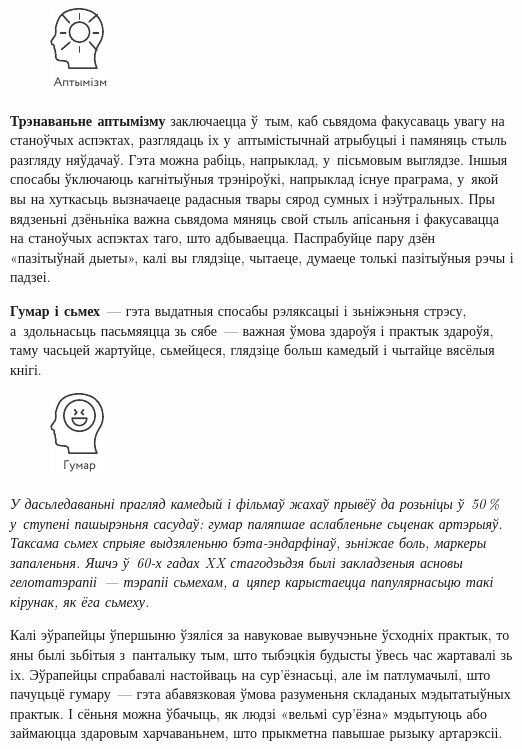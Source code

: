 \begin{figure}[htb!]
  \centering
  \includegraphics[scale=1.5]{willpower/ch7/15.pdf}
\end{figure}

\textbf{Трэнаваньне аптымізму} заключаецца ў~тым, каб сьвядома факусаваць увагу на станоўчых аспэктах, разглядаць іх у~аптымістычнай атрыбуцыі і памяняць стыль разгляду няўдачаў. Гэта можна рабіць, напрыклад, у~пісьмовым выглядзе. Іншыя спосабы ўключаюць кагнітыўныя трэніроўкі, напрыклад існуе праграма, у~якой вы на хуткасьць вызначаеце радасныя твары сярод сумных і нэўтральных. Пры вядзеньні дзёньніка важна сьвядома мяняць свой стыль апісаньня і факусавацца на станоўчых аспэктах таго, што адбываецца. Паспрабуйце пару дзён «пазітыўнай дыеты», калі вы глядзіце, чытаеце, думаеце толькі пазітыўныя рэчы і падзеі.

\textbf{Гумар і сьмех}~--- гэта выдатныя спосабы рэляксацыі і зьніжэньня стрэсу, а~здольнасьць пасьмяяцца зь сябе~--- важная ўмова здароўя і практык здароўя, таму часьцей жартуйце, сьмейцеся, глядзіце больш камедый і чытайце вясёлыя кнігі. 

\begin{figure}[htb!]
  \centering
  \includegraphics[scale=1.5]{willpower/ch7/16.pdf}
\end{figure}

\emph{У дасьледаваньні прагляд камедый і фільмаў жахаў прывёў да розьніцы ў~50\,\% у~ступені пашырэньня сасудаў: гумар паляпшае аслабленьне сьценак артэрыяў. Таксама сьмех спрыяе выдзяленьню бэта-эндарфінаў, зьніжае боль, маркеры запаленьня. Яшчэ ў~60-х гадах XX стагодзьдзя былі закладзеныя асновы гелотатэрапіі~--- тэрапіі сьмехам, а~цяпер карыстаецца папулярнасьцю такі кірунак, як ёга сьмеху.}

Калі эўрапейцы ўпершыню ўзяліся за навуковае вывучэньне ўсходніх практык, то яны былі зьбітыя з~панталыку тым, што тыбэцкія будысты ўвесь час жартавалі зь іх. Эўрапейцы спрабавалі настойваць на сур'ёзнасьці, але ім патлумачылі, што пачуцьцё гумару~--- гэта абавязковая ўмова разуменьня складаных мэдытатыўных практык. І сёньня можна ўбачыць, як людзі «вельмі сур'ёзна» мэдытуюць або займаюцца здаровым харчаваньнем, што прыкметна павышае рызыку артарэксіі. 

